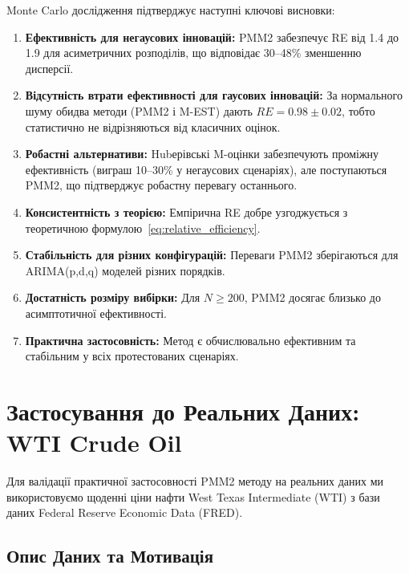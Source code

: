 \documentclass[12pt,a4paper]{article}
\begin{document}
Monte Carlo дослідження підтверджує наступні ключові висновки:

\begin{enumerate}
    \item \textbf{Ефективність для негаусових інновацій:} PMM2 забезпечує RE від 1.4 до 1.9 для асиметричних розподілів, що відповідає 30--48\% зменшенню дисперсії.

\item \textbf{Відсутність втрати ефективності для гаусових інновацій:} За нормального шуму обидва методи (PMM2 і M-EST) дають $RE = 0.98 \pm 0.02$, тобто статистично не відрізняються від класичних оцінок.
\item \textbf{Робастні альтернативи:} Hubерівські M-оцінки забезпечують проміжну ефективність (виграш 10--30\% у негаусових сценаріях), але поступаються PMM2, що підтверджує робастну перевагу останнього.

    \item \textbf{Консистентність з теорією:} Емпірична RE добре узгоджується з теоретичною формулою~\eqref{eq:relative_efficiency}.

    \item \textbf{Стабільність для різних конфігурацій:} Переваги PMM2 зберігаються для ARIMA(p,d,q) моделей різних порядків.

    \item \textbf{Достатність розміру вибірки:} Для $N \geq 200$, PMM2 досягає близько до асимптотичної ефективності.

    \item \textbf{Практична застосовність:} Метод є обчислювально ефективним та стабільним у всіх протестованих сценаріях.
\end{enumerate}

\section{Застосування до Реальних Даних: WTI Crude Oil}
\label{sec:wti_application}

Для валідації практичної застосовності PMM2 методу на реальних даних ми використовуємо щоденні ціни нафти West Texas Intermediate (WTI) з бази даних Federal Reserve Economic Data (FRED).

\subsection{Опис Даних та Мотивація}
\label{subsec:wti_data_description}
\end{document}
